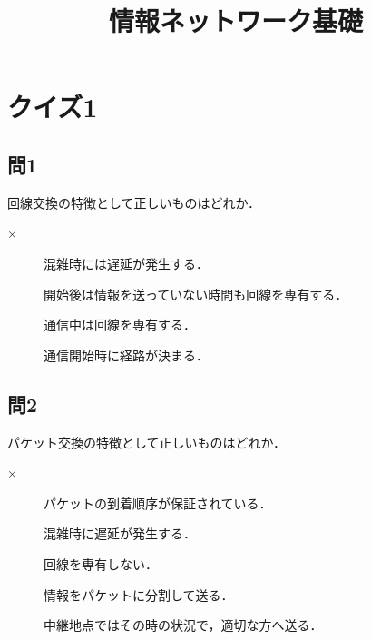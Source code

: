 \documentclass[paper=a4,10pt,twocolumn]{jlreq}
\title{\vspace{-2cm}情報ネットワーク基礎}
\author{}
\date{}
\begin{document}
\newcommand{\ci}{◯}
\newcommand{\bt}{×}
\section*{クイズ1}
\subsection*{問1}
回線交換の特徴として正しいものはどれか．
\begin{description}
    \item[\bt] 混雑時には遅延が発生する．
    \item[\ci] 開始後は情報を送っていない時間も回線を専有する．
    \item[\ci] 通信中は回線を専有する．
    \item[\ci] 通信開始時に経路が決まる．
\end{description}
\subsection*{問2}
パケット交換の特徴として正しいものはどれか．
\begin{description}
    \item[\bt] パケットの到着順序が保証されている．
    \item[\ci] 混雑時に遅延が発生する．
    \item[\ci] 回線を専有しない．
    \item[\ci] 情報をパケットに分割して送る．
    \item[\ci] 中継地点ではその時の状況で，適切な方へ送る．
\end{description}
\end{document}
